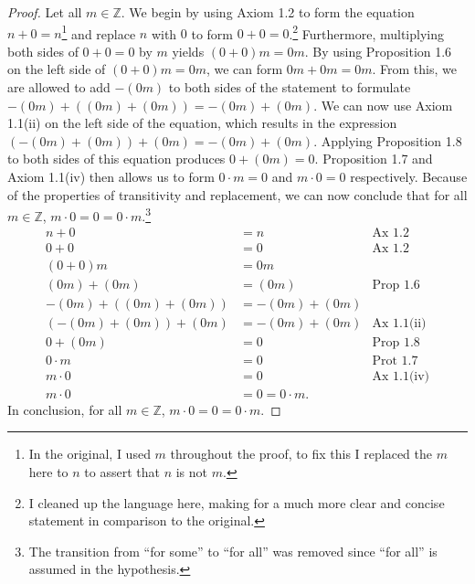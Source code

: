 \documentclass[12pt]{amsart}
\newcommand{\Z}{\mathbb{Z}}
\begin{document}
\begin{proof}
Let all $m\in\Z$.  We begin by using Axiom 1.2 to form the equation $n+0=n$\footnote{In the original, I used $m$ throughout the proof, to fix this I replaced the $m$ here to $n$ to assert that $n$ is not $m$.} and replace $n$ with $0$ to form $0+0=0$.\footnote{I cleaned up the language here, making for a much more clear and concise statement in comparison to the original.}  Furthermore, multiplying both sides of $0+0=0$ by $m$ yields $(0+0)m=0m$.  By using Proposition 1.6 on the left side of $(0+0)m=0m$, we can form $0m+0m=0m$.  From this, we are allowed to add $-(0m)$ to both sides of the statement to formulate $-(0m)+((0m)+(0m))=-(0m)+(0m)$.  We can now use Axiom 1.1(ii) on the left side of the equation, which results in the expression $(-(0m)+(0m))+(0m)=-(0m)+(0m)$.  Applying Proposition 1.8 to both sides of this equation produces $0+(0m)=0$.  Proposition 1.7 and Axiom 1.1(iv) then allows us to form $0\cdot m=0$ and $m\cdot 0=0$ respectively.  Because of the properties of transitivity and replacement, we can now conclude that for all $m\in\Z$, $m\cdot 0 = 0 = 0\cdot m$.\footnote{The transition from ``for some'' to ``for all'' was removed since ``for all'' is assumed in the hypothesis.}
\begin{align*}
n+0&=n&\text{Ax 1.2}\\
0+0&=0&\text{Ax 1.2}\\
(0+0)m&=0m\\
(0m)+(0m)&=(0m)&\text{Prop 1.6}\\
-(0m)+((0m)+(0m))&=-(0m)+(0m)\\
(-(0m)+(0m))+(0m)&=-(0m)+(0m)&\text{Ax 1.1(ii)}\\
0+(0m)&=0&\text{Prop 1.8}\\
0\cdot m&=0&\text{Prot 1.7}\\
m\cdot 0&=0&\text{Ax 1.1(iv)}\\
m\cdot 0 &= 0 = 0\cdot m.
\end{align*}
In conclusion, for all $m\in\Z$, $m\cdot 0 = 0 = 0\cdot m$.
\end{proof}
\end{document}
